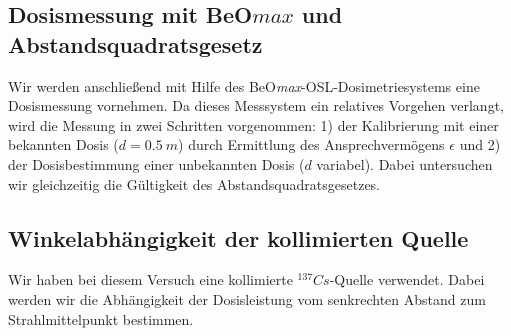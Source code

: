 \subsection{Dosismessung mit BeO$max$ und Abstandsquadratsgesetz}
Wir werden anschließend mit Hilfe des BeO\textit{max}-OSL-Dosimetriesystems eine Dosismessung vornehmen. Da dieses Messsystem ein relatives Vorgehen verlangt, wird die Messung in zwei Schritten vorgenommen: 1) der Kalibrierung mit einer bekannten Dosis ($d=0.5\ m$) durch Ermittlung des Ansprechvermögens $\epsilon$ und 2) der Dosisbestimmung einer unbekannten Dosis ($d$ variabel). Dabei untersuchen wir gleichzeitig die Gültigkeit des Abstandsquadratsgesetzes.

\subsection{Winkelabhängigkeit der kollimierten Quelle}
Wir haben bei diesem Versuch eine kollimierte $^{137}Cs$-Quelle verwendet. Dabei werden wir die Abhängigkeit der Dosisleistung vom senkrechten Abstand zum Strahlmittelpunkt bestimmen.
